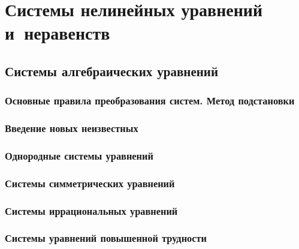 \documentclass[14pt, oneside]{extbook}
\begin{document}
\chapter{Системы нелинейных уравнений и~неравенств}
\section{Системы алгебраических уравнений}
\subsection{Основные правила преобразования систем. Метод подстановки}

\subsection{Введение новых неизвестных}

\subsection{Однородные системы уравнений}

\subsection{Системы симметрических уравнений}

\subsection{Системы иррациональных уравнений}

\subsection{Системы уравнений повышенной трудности}

\end{document}
